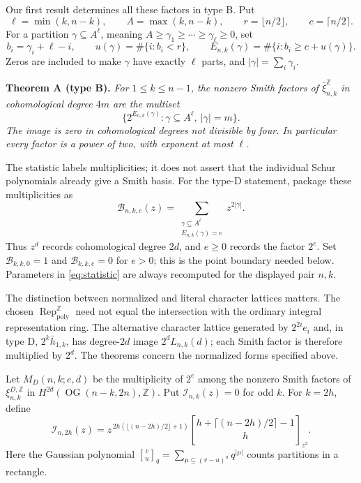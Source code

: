 \documentclass[11pt,letterpaper]{article}
\newcommand{\Z}{\mathbb Z}
\newcommand{\Rep}{\operatorname{Rep}}
\newcommand{\OG}{\operatorname{OG}}
\newcommand{\poly}{\mathrm{poly}}
\newcommand{\hbarprod}{\bar h_{1,k}}
\newcommand{\qb}[3]{\genfrac{[}{]}{0pt}{}{#1}{#2}_{#3}}
\begin{document}
Our first result determines all these factors in type B. Put
\[
 \ell=\min(k,n-k),\qquad A=\max(k,n-k),\qquad
 r=\lfloor n/2\rfloor,\qquad c=\lceil n/2\rceil.
\]
For a partition \(\gamma\subseteq A^\ell\), meaning
\(A\ge\gamma_1\ge\cdots\ge\gamma_\ell\ge0\), set
\begin{equation}\label{eq:statistic}
 b_i=\gamma_i+\ell-i,\qquad
 u(\gamma)=\#\{i:b_i<r\},\qquad
 E_{n,k}(\gamma)=\#\{i:b_i\ge c+u(\gamma)\}.
\end{equation}
Zeros are included to make \(\gamma\) have exactly \(\ell\) parts,
and \(|\gamma|=\sum_i\gamma_i\).

\medskip\noindent
\textbf{Theorem A (type B).}
\emph{For \(1\le k\le n-1\), the nonzero Smith factors of
\(\bar\xi^\Z_{n,k}\) in cohomological degree \(4m\) are the multiset}
\begin{equation}\label{eq:typeB}
 \bigl\{2^{E_{n,k}(\gamma)}:
       \gamma\subseteq A^\ell,\ |\gamma|=m\bigr\}.
\end{equation}
\emph{The image is zero in cohomological degrees not divisible by four.
In particular every factor is a power of two, with exponent at most \(\ell\).}

\medskip
The statistic labels multiplicities; it does not assert that the individual
Schur polynomials already give a Smith basis.
For the type-D statement, package these multiplicities as
\begin{equation}\label{eq:Bseries}
 \mathcal B_{n,k,e}(z)=
 \sum_{\substack{\gamma\subseteq A^\ell\\E_{n,k}(\gamma)=e}}
 z^{2|\gamma|}.
\end{equation}
Thus \(z^d\) records cohomological degree \(2d\), and \(e\ge0\) records
the factor \(2^e\). Set \(\mathcal B_{k,k,0}=1\) and
\(\mathcal B_{k,k,e}=0\) for \(e>0\); this is the point boundary needed
below. Parameters in \eqref{eq:statistic} are always recomputed for
the displayed pair \(n,k\).

The distinction between normalized and literal character lattices matters.
The chosen \(\Rep^\Z_{\poly}\) need not equal the intersection with the
ordinary integral representation ring. The alternative character lattice
generated by \(2^{2i}e_i\) and, in type D, \(2^k\hbarprod\), has
degree-\(2d\) image \(2^dL_{n,k}(d)\); each Smith factor is therefore
multiplied by \(2^d\).
The theorems concern the normalized forms specified above.

\newpage
Let \(M_D(n,k;e,d)\) be the multiplicity of \(2^e\) among the nonzero
Smith factors of \(\xi^{D,\Z}_{n,k}\) in \(H^{2d}(\OG(n-k,2n),\Z)\).
Put \(\mathcal I_{n,k}(z)=0\) for odd \(k\). For \(k=2h\), define
\begin{equation}\label{eq:overlap}
 \mathcal I_{n,2h}(z)=
 z^{\,2h(\lfloor(n-2h)/2\rfloor+1)}
 \qb{h+\lceil(n-2h)/2\rceil-1}{h}{z^2}.
\end{equation}
Here the Gaussian polynomial
\(\qb{v}{u}{q}=\sum_{\mu\subseteq(v-u)^u}q^{|\mu|}\)
counts partitions in a rectangle.
\end{document}
